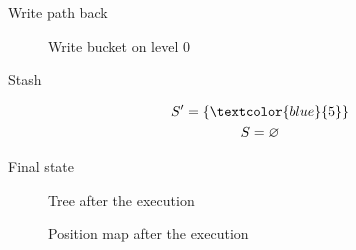 	\begin{frame}{Write path back}

		\selectedtrue%
		\pathreadtrue%

		\nodeonenewtrue%
		\nodetwonewtrue%
		\nodethreenewtrue%
		\nodefournewtrue%

		\begin{figure}
			\centering

			
			\caption{Write bucket on level $0$}
		\end{figure}
		
		\vspace{-12pt}

		\begin{block}{Stash}
			
			\begin{gather*}
				S^\prime = \{ \textcolor{blue}{5} \} \\
				S = \varnothing
			\end{gather*}

		\end{block}

	\end{frame}

	\begin{frame}{Final state}

		\selectedtrue%
		\pathreadtrue%

		\nodeonenewtrue%
		\nodetwonewtrue%
		\nodethreenewtrue%
		\nodefournewtrue%

		\begin{figure}
			\centering

			
			\caption{Tree after the execution}
		\end{figure}

		\vspace{-12pt}
		
		\begin{figure}
			\centering

			
			\caption{Position map after the execution}
		\end{figure}
		
	\end{frame}
